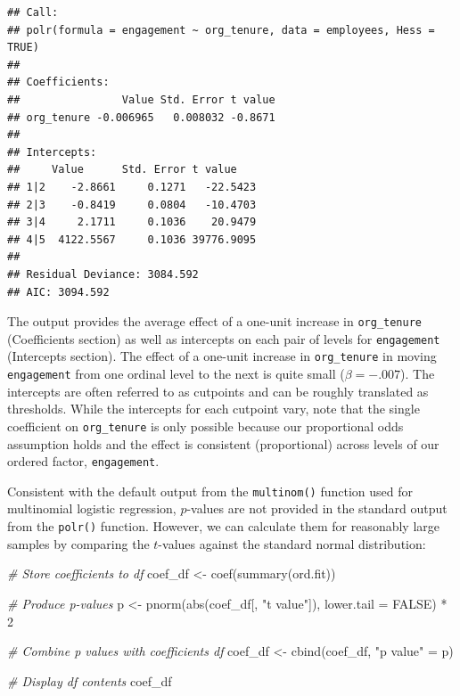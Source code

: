 \documentclass[
]{book}
\newenvironment{Shaded}{\begin{snugshade}}{\end{snugshade}}
\newcommand{\AttributeTok}[1]{\textcolor[rgb]{0.77,0.63,0.00}{#1}}
\newcommand{\CommentTok}[1]{\textcolor[rgb]{0.56,0.35,0.01}{\textit{#1}}}
\newcommand{\ConstantTok}[1]{\textcolor[rgb]{0.00,0.00,0.00}{#1}}
\newcommand{\DecValTok}[1]{\textcolor[rgb]{0.00,0.00,0.81}{#1}}
\newcommand{\FunctionTok}[1]{\textcolor[rgb]{0.00,0.00,0.00}{#1}}
\newcommand{\NormalTok}[1]{#1}
\newcommand{\OtherTok}[1]{\textcolor[rgb]{0.56,0.35,0.01}{#1}}
\newcommand{\SpecialCharTok}[1]{\textcolor[rgb]{0.00,0.00,0.00}{#1}}
\newcommand{\StringTok}[1]{\textcolor[rgb]{0.31,0.60,0.02}{#1}}
\begin{document}
\begin{verbatim}
## Call:
## polr(formula = engagement ~ org_tenure, data = employees, Hess = TRUE)
## 
## Coefficients:
##                Value Std. Error t value
## org_tenure -0.006965   0.008032 -0.8671
## 
## Intercepts:
##     Value      Std. Error t value   
## 1|2    -2.8661     0.1271   -22.5423
## 2|3    -0.8419     0.0804   -10.4703
## 3|4     2.1711     0.1036    20.9479
## 4|5  4122.5567     0.1036 39776.9095
## 
## Residual Deviance: 3084.592 
## AIC: 3094.592
\end{verbatim}

The output provides the average effect of a one-unit increase in \texttt{org\_tenure} (Coefficients section) as well as intercepts on each pair of levels for \texttt{engagement} (Intercepts section). The effect of a one-unit increase in \texttt{org\_tenure} in moving \texttt{engagement} from one ordinal level to the next is quite small (\(\beta = -.007\)). The intercepts are often referred to as cutpoints and can be roughly translated as thresholds. While the intercepts for each cutpoint vary, note that the single coefficient on \texttt{org\_tenure} is only possible because our proportional odds assumption holds and the effect is consistent (proportional) across levels of our ordered factor, \texttt{engagement}.

Consistent with the default output from the \texttt{multinom()} function used for multinomial logistic regression, \(p\)-values are not provided in the standard output from the \texttt{polr()} function. However, we can calculate them for reasonably large samples by comparing the \(t\)-values against the standard normal distribution:

\begin{Shaded}
\begin{Highlighting}[]
\CommentTok{\# Store coefficients to df}
\NormalTok{coef\_df }\OtherTok{\textless{}{-}} \FunctionTok{coef}\NormalTok{(}\FunctionTok{summary}\NormalTok{(ord.fit))}

\CommentTok{\# Produce p{-}values}
\NormalTok{p }\OtherTok{\textless{}{-}} \FunctionTok{pnorm}\NormalTok{(}\FunctionTok{abs}\NormalTok{(coef\_df[, }\StringTok{"t value"}\NormalTok{]), }\AttributeTok{lower.tail =} \ConstantTok{FALSE}\NormalTok{) }\SpecialCharTok{*} \DecValTok{2}

\CommentTok{\# Combine p values with coefficients df}
\NormalTok{coef\_df }\OtherTok{\textless{}{-}} \FunctionTok{cbind}\NormalTok{(coef\_df, }\StringTok{"p value"} \OtherTok{=}\NormalTok{ p)}

\CommentTok{\# Display df contents}
\NormalTok{coef\_df}
\end{Highlighting}
\end{Shaded}
\end{document}
